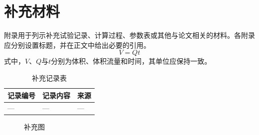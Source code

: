 \chapter{补充材料}
附录用于列示补充试验记录、计算过程、参数表或其他与论文相关的材料。各附录应分别设置标题，并在正文中给出必要的引用。
\begin{equation}
 V=Qt
 \label{eq:appendix-volume}
\end{equation}
式中，$V$、$Q$与$t$分别为体积、体积流量和时间，其单位应保持一致。
\begin{table}[htbp]
\caption{补充记录表}\label{tab:appendix}
\centering\tjsmall
\begin{tabularx}{\textwidth}{@{}lXX@{}}\toprule
记录编号&记录内容&来源\\\midrule
—&—&—\\\bottomrule
\end{tabularx}
\end{table}
\begin{figure}[htbp]
\centering{}
\caption{补充图}\label{fig:appendix}
\end{figure}
